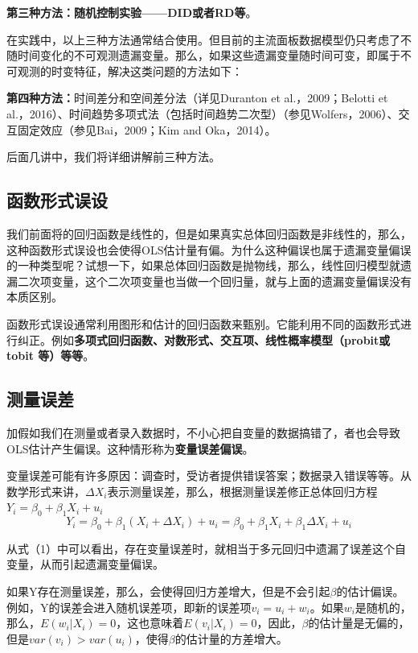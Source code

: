 \documentclass[cn,10pt,math=newtx,citestyle=gb7714-2015,bibstyle=gb7714-2015]{elegantbook}
\begin{document}
\textbf{第三种方法：随机控制实验——DID或者RD等}。

在实践中，以上三种方法通常结合使用。但目前的主流面板数据模型仍只考虑了不随时间变化的不可观测遗漏变量。那么，如果这些遗漏变量随时间可变，即属于不可观测的时变特征，解决这类问题的方法如下：

\textbf{第四种方法：}时间差分和空间差分法（详见Duranton et al.，2009；Belotti et al.，2016）、时间趋势多项式法（包括时间趋势二次型）（参见Wolfers，2006）、交互固定效应（参见Bai，2009；Kim and Oka，2014）。

后面几讲中，我们将详细讲解前三种方法。

\subsection{函数形式误设}
我们前面将的回归函数是线性的，但是如果真实总体回归函数是非线性的，那么，这种函数形式误设也会使得OLS估计量有偏。为什么这种偏误也属于遗漏变量偏误的一种类型呢？试想一下，如果总体回归函数是抛物线，那么，线性回归模型就遗漏二次项变量，这个二次项变量也当做一个回归量，就与上面的遗漏变量偏误没有本质区别。

函数形式误设通常利用图形和估计的回归函数来甄别。它能利用不同的函数形式进行纠正。例如\textbf{多项式回归函数、对数形式、交互项、线性概率模型（probit或tobit 等）等等}。

\subsection{测量误差}
加假如我们在测量或者录入数据时，不小心把自变量的数据搞错了，者也会导致OLS估计产生偏误。这种情形称为\textbf{变量误差偏误}。

变量误差可能有许多原因：调查时，受访者提供错误答案；数据录入错误等等。从数学形式来讲，$\Delta{X}_i$表示测量误差，那么，根据测量误差修正总体回归方程$Y_i=\beta_0+\beta_1X_i+u_i$
\begin{equation}
	Y_i=\beta_0+\beta_1(X_i+\Delta{X}_i)+u_i=\beta_0+\beta_1X_i+\beta_1\Delta{X}_i+u_i
\end{equation}

从式（1）中可以看出，存在变量误差时，就相当于多元回归中遗漏了误差这个自变量，从而引起遗漏变量偏误。

如果Y存在测量误差，那么，会使得回归方差增大，但是不会引起$\beta$的估计偏误。例如，Y的误差会进入随机误差项，即新的误差项$v_i=u_i+w_i$。如果$w_i$是随机的，那么，$E(w_i|X_i)=0$，这也意味着$E(v_i|X_i)=0$，因此，$\beta$的估计量是无偏的，但是$var(v_i)>var(u_i)$，使得$\beta$的估计量的方差增大。
\end{document}
